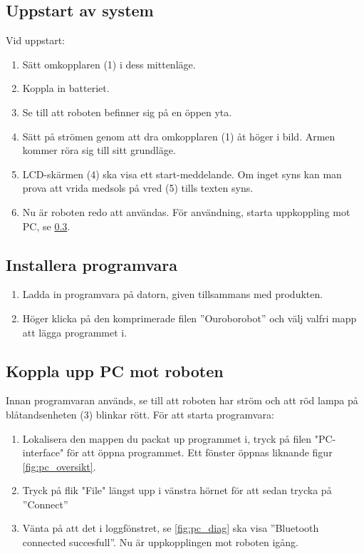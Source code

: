 \documentclass[a4paper,12pt]{article}
\begin{document}
\subsection{Uppstart av system}
Vid uppstart:
\begin{enumerate}
    \item Sätt omkopplaren (1) i dess mittenläge.
    \item Koppla in batteriet.
    \item Se till att roboten befinner sig på en öppen yta.
    \item Sätt på strömen genom att dra omkopplaren (1) åt höger i bild. Armen kommer röra sig till sitt grundläge.
    \item LCD-skärmen (4) ska visa ett start-meddelande. Om inget syns kan man prova att vrida medsols på vred (5) tills texten syns.
    \item  Nu är roboten redo att användas. För användning, starta uppkoppling mot PC, se \ref{subsec:start_pc}.
\end{enumerate}

\subsection{Installera programvara}
\label{subsec:install_pc}
\begin{enumerate}
    \item Ladda in programvara på datorn, given tillsammans med produkten.
    \item Höger klicka på den komprimerade filen ''Ouroborobot'' och välj valfri mapp att lägga programmet i.
\end{enumerate}


\subsection{Koppla upp PC mot roboten}
\label{subsec:start_pc}
Innan programvaran används, se till att roboten har ström och att röd lampa på blåtandsenheten (3) blinkar rött. För att starta programvara:
\begin{enumerate}
    \item Lokalisera den mappen du packat up programmet i, tryck på filen "PC-interface" för att öppna programmet.  Ett fönster öppnas liknande figur \ref{fig:pc_oversikt}. 
    \item Tryck på flik "File"  längst upp i vänstra hörnet för att sedan trycka på ''Connect''
    \item Vänta på att det i loggfönstret, se \ref{fig:pc_diag}  ska visa ''Bluetooth connected succesfull''. Nu är uppkopplingen mot roboten igång. 
\end{enumerate}
\end{document}
